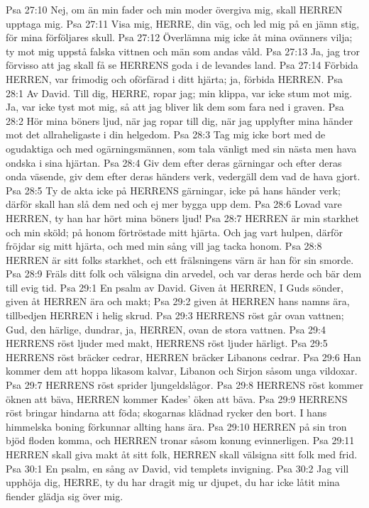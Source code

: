 Psa 27:10  Nej, om än min fader och min moder övergiva mig, skall HERREN upptaga mig.
Psa 27:11  Visa mig, HERRE, din väg, och led mig på en jämn stig, för mina förföljares skull.
Psa 27:12  Överlämna mig icke åt mina ovänners vilja; ty mot mig uppstå falska vittnen och män som andas våld.
Psa 27:13  Ja, jag tror förvisso att jag skall få se HERRENS goda i de levandes land.
Psa 27:14  Förbida HERREN, var frimodig och oförfärad i ditt hjärta; ja, förbida HERREN.
Psa 28:1  Av David. Till dig, HERRE, ropar jag; min klippa, var icke stum mot mig. Ja, var icke tyst mot mig, så att jag bliver lik dem som fara ned i graven.
Psa 28:2  Hör mina böners ljud, när jag ropar till dig, när jag upplyfter mina händer mot det allraheligaste i din helgedom.
Psa 28:3  Tag mig icke bort med de ogudaktiga och med ogärningsmännen, som tala vänligt med sin nästa men hava ondska i sina hjärtan.
Psa 28:4  Giv dem efter deras gärningar och efter deras onda väsende, giv dem efter deras händers verk, vedergäll dem vad de hava gjort.
Psa 28:5  Ty de akta icke på HERRENS gärningar, icke på hans händer verk; därför skall han slå dem ned och ej mer bygga upp dem.
Psa 28:6  Lovad vare HERREN, ty han har hört mina böners ljud!
Psa 28:7  HERREN är min starkhet och min sköld; på honom förtröstade mitt hjärta. Och jag vart hulpen, därför fröjdar sig mitt hjärta, och med min sång vill jag tacka honom.
Psa 28:8  HERREN är sitt folks starkhet, och ett frälsningens värn är han för sin smorde.
Psa 28:9  Fräls ditt folk och välsigna din arvedel, och var deras herde och bär dem till evig tid.
Psa 29:1  En psalm av David. Given åt HERREN, I Guds sönder, given åt HERREN ära och makt;
Psa 29:2  given åt HERREN hans namns ära, tillbedjen HERREN i helig skrud.
Psa 29:3  HERRENS röst går ovan vattnen; Gud, den härlige, dundrar, ja, HERREN, ovan de stora vattnen.
Psa 29:4  HERRENS röst ljuder med makt, HERRENS röst ljuder härligt.
Psa 29:5  HERRENS röst bräcker cedrar, HERREN bräcker Libanons cedrar.
Psa 29:6  Han kommer dem att hoppa likasom kalvar, Libanon och Sirjon såsom unga vildoxar.
Psa 29:7  HERRENS röst sprider ljungeldslågor.
Psa 29:8  HERRENS röst kommer öknen att bäva, HERREN kommer Kades' öken att bäva.
Psa 29:9  HERRENS röst bringar hindarna att föda; skogarnas klädnad rycker den bort. I hans himmelska boning förkunnar allting hans ära.
Psa 29:10  HERREN på sin tron bjöd floden komma, och HERREN tronar såsom konung evinnerligen.
Psa 29:11  HERREN skall giva makt åt sitt folk, HERREN skall välsigna sitt folk med frid.
Psa 30:1  En psalm, en sång av David, vid templets invigning.
Psa 30:2  Jag vill upphöja dig, HERRE, ty du har dragit mig ur djupet, du har icke låtit mina fiender glädja sig över mig.
